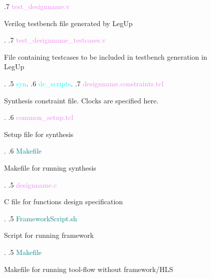 \begin{figure}
\begin{minipage}{0.99\textwidth}
{    .7 \textcolor{violet}{test\_designname{.}v} \dotfill \:\:\begin{minipage}[t]{5.4cm}
                                                    Verilog testbench file generated by LegUp
                                                    \end{minipage}.
    .7 \textcolor{violet}{test\_designname\_testcases{.}v} \dotfill \:\:\begin{minipage}[t]{5.4cm}
                                                    File containing testcases to be included in testbench generation in LegUp
                                                    \end{minipage}.
    .5 \textcolor{cyan}{syn}.
    .6 \textcolor{cyan}{dc\_scripts}.
    .7 \textcolor{violet}{designname{.}constraints{.}tcl} \dotfill \:\:\begin{minipage}[t]{5.4cm}
                                                            Synthesis constraint file{.} Clocks are specified here{.}
                                                            \end{minipage}.
    .6 \textcolor{violet}{common\_setup{.}tcl} \dotfill \:\:\begin{minipage}[t]{5.4cm}
                                                            Setup file for synthesis 
                                                            \end{minipage}.
    .6 \textcolor{teal}{Makefile} \dotfill \:\:\begin{minipage}[t]{5.4cm}
                                                            Makefile for running synthesis
                                                            \end{minipage}.
    .5 \textcolor{violet}{designname{.}c} \dotfill \:\:\begin{minipage}[t]{5.4cm}
                                                            C file for functions design specification
                                                            \end{minipage}.
    .5 \textcolor{teal}{FrameworkScript{.}sh} \dotfill \:\:\begin{minipage}[t]{5.4cm}
                                                            Script for running framework
                                                            \end{minipage}. 
    .5 \textcolor{teal}{Makefile} \dotfill \:\:\begin{minipage}[t]{5.4cm}
                                                            Makefile for running tool-flow without framework/HLS

\end{minipage}}
\end{minipage}
\end{figure}
